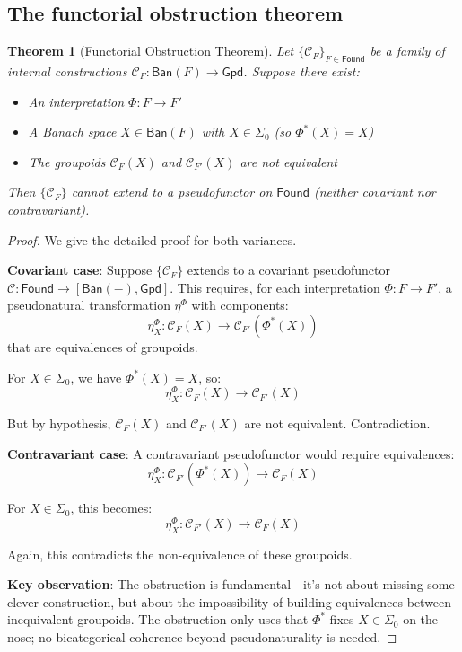 \documentclass[11pt]{article}
\newtheorem{theorem}{Theorem}[section]
\theoremstyle{definition}
\theoremstyle{remark}
\newcommand{\Found}{\mathsf{Found}}
\newcommand{\Gpd}{\mathsf{Gpd}}
\newcommand{\Ban}{\mathsf{Ban}}
\begin{document}
\subsection{The functorial obstruction theorem}\label{ssec:no-pseudofunctor}

\begin{theorem}[Functorial Obstruction Theorem]\label{thm:obstruction}
Let \(\{\mathcal C_F\}_{F \in \Found}\) be a family of internal constructions \(\mathcal C_F: \Ban(F) \to \Gpd\). Suppose there exist:
\begin{itemize}
\item An interpretation \(\Phi: F \to F'\)
\item A Banach space \(X \in \Ban(F)\) with \(X \in \Sigma_0\) (so \(\Phi^*(X) = X\))
\item The groupoids \(\mathcal C_F(X)\) and \(\mathcal C_{F'}(X)\) are not equivalent
\end{itemize}
Then \(\{\mathcal C_F\}\) cannot extend to a pseudofunctor on \(\Found\) (neither covariant nor contravariant).
\end{theorem}

\begin{proof}
We give the detailed proof for both variances.

\textbf{Covariant case}: Suppose \(\{\mathcal C_F\}\) extends to a covariant pseudofunctor \(\mathcal{C}: \Found \to [\Ban(-), \Gpd]\). This requires, for each interpretation \(\Phi: F \to F'\), a pseudonatural transformation \(\eta^\Phi\) with components:
\[\eta^\Phi_X: \mathcal C_F(X) \to \mathcal C_{F'}(\Phi^*(X))\]
that are equivalences of groupoids.

For \(X \in \Sigma_0\), we have \(\Phi^*(X) = X\), so:
\[\eta^\Phi_X: \mathcal C_F(X) \to \mathcal C_{F'}(X)\]

But by hypothesis, \(\mathcal C_F(X)\) and \(\mathcal C_{F'}(X)\) are not equivalent. Contradiction.

\textbf{Contravariant case}: A contravariant pseudofunctor would require equivalences:
\[\eta^\Phi_X: \mathcal C_{F'}(\Phi^*(X)) \to \mathcal C_F(X)\]

For \(X \in \Sigma_0\), this becomes:
\[\eta^\Phi_X: \mathcal C_{F'}(X) \to \mathcal C_F(X)\]

Again, this contradicts the non-equivalence of these groupoids.

\textbf{Key observation}: The obstruction is fundamental---it's not about missing some clever construction, but about the impossibility of building equivalences between inequivalent groupoids. The obstruction only uses that \(\Phi^*\) fixes \(X\in\Sigma_0\) on-the-nose; no bicategorical coherence beyond pseudonaturality is needed.
\end{proof}
\end{document}
